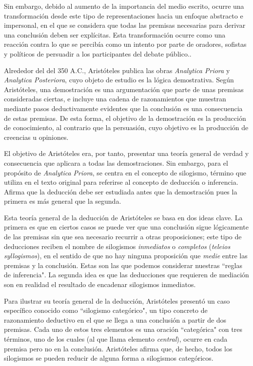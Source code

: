 \documentclass{article}
\begin{document}
Sin embargo, debido al aumento de la importancia del medio escrito, ocurre una transformación desde este tipo de representaciones hacia un enfoque abstracto e impersonal, en el que se considera que todas las premisas necesarias para derivar una conclusión deben ser explícitas. Esta transformación ocurre como una reacción contra lo que se percibía como un intento por parte de oradores, sofistas y políticos de persuadir a los participantes del debate público.\cite{novaes2020dialogical}.

Alrededor del del 350 A.C., Aristóteles publica las obras \textit{Analytica Priora} y \textit{Analytica Posteriora}, cuyo objeto de estudio es la lógica demostrativa\cite{smith1989prior}. Según Aristóteles, una demostración es una argumentación que parte de unas premisas consideradas ciertas, e incluye una cadena de razonamientos que muestran mediante pasos deductivamente evidentes que la conclusión es una consecuencia de estas premisas. De esta forma, el objetivo de la demostración es la producción de conocimiento, al contrario que la persuasión, cuyo objetivo es la producción de creencias u opiniones\cite{corcoran2009aristotle}.

El objetivo de Aristóteles era, por tanto, presentar una teoría general de verdad y consecuencia que aplicara a todas las demostraciones. Sin embargo, para el propósito de \textit{Analytica Priora}, se centra en el concepto de silogismo, término que utiliza en el texto original para referirse al concepto de deducción o inferencia\cite{ross1964aristotle}. Afirma que la deducción debe ser estudiada antes que la demostración pues la primera es más general que la segunda\cite{smith1989prior}.

Esta teoría general de la deducción de Aristóteles se basa en dos ideas clave. La primera es que en ciertos casos se puede ver que una conclusión sigue lógicamente de las premisas sin que sea necesario recurrir a otras proposiciones; este tipo de deducciones reciben el nombre de silogismos \textit{inmediatos} o \textit{completos} (\textit{teleios syllogismos}), en el sentido de que no hay ninguna proposición que \textit{medie} entre las premisas y la conclusión. Estas son las que podemos considerar nuestras ``reglas de inferencia". La segunda idea es que las deducciones que requieren de mediación son en realidad el resultado de encadenar silogismos inmediatos\cite{corcoran2009aristotle}.

Para ilustrar su teoría general de la deducción, Aristóteles presentó un caso específico conocido como ``silogismo categórico"\cite{corcoran2009aristotle}, un tipo concreto de razonamiento deductivo en el que se llega a una conclusión a partir de dos premisas. Cada uno de estos tres elementos es una oración ``categórica" con tres términos, uno de los cuales (al que llama elemento \textit{central}), ocurre en cada premisa pero no en la conclusión. Aristóteles afirma que, de hecho, todos los silogismos se pueden reducir de alguna forma a silogismos categóricos\cite{smith1989prior}.
\end{document}
